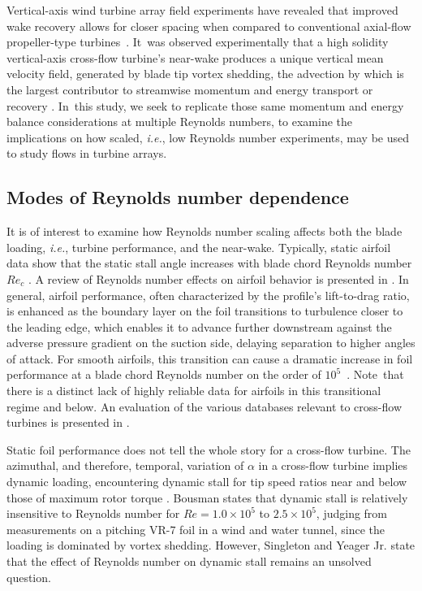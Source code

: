 Vertical-axis wind turbine array field experiments have revealed that improved
wake recovery allows for closer spacing when compared to conventional axial-flow
propeller-type \mbox{turbines \cite{Dabiri2011, Kinzel2012}}. It~was observed
experimentally that a high solidity vertical-axis cross-flow turbine's near-wake
produces a unique vertical mean velocity field, generated by blade tip vortex
shedding, the advection by which is the largest contributor to streamwise
momentum and energy transport or recovery \cite{Bachant2015-JoT}. In~this study,
we seek to replicate those same momentum and energy balance considerations at
multiple Reynolds numbers, to examine the implications on how scaled,
\emph{i.e.}, low Reynolds number experiments, may be used to study flows in
turbine arrays.


\subsection{Modes of Reynolds number dependence}

It is of interest to examine how Reynolds number scaling affects both the blade
loading, \emph{i.e.}, turbine performance, and the near-wake. Typically, static
airfoil data show that the static stall angle increases with blade chord
Reynolds number $Re_c$ \cite{Jacobs1937}. A review of Reynolds number effects on
airfoil behavior is presented in \cite{Lissaman1983}. In general, airfoil
performance, often characterized by the profile's lift-to-drag ratio, is
enhanced as the boundary layer on the foil transitions to turbulence closer to
the leading edge, which enables it to advance further downstream against the
adverse pressure gradient on the suction side, delaying separation to higher
angles of attack. For smooth airfoils, this transition can cause a dramatic
increase in foil performance at a blade chord Reynolds number on the order of
\mbox{$10^5$ \cite{McMasters1980}}. Note~that there is a distinct lack of highly
reliable data for airfoils in this transitional regime and below. An evaluation
of the various databases relevant to cross-flow turbines is presented in
\cite{Bedon2014}.

Static foil performance does not tell the whole story for a cross-flow turbine.
The azimuthal, and therefore, temporal, variation of $\alpha$ in a cross-flow
turbine implies dynamic loading, encountering dynamic stall for tip speed ratios
near and below those of maximum rotor torque \cite{Para2002}. Bousman
\cite{Bousman2000-evaluation} states that dynamic stall is relatively
insensitive to Reynolds number for $Re=1.0 \times 10^5$ to $2.5 \times 10^5$,
judging from measurements on a pitching VR-7 foil in a wind and water tunnel,
since the loading is dominated by vortex shedding. However, Singleton and Yeager
Jr. \cite{Singleton2000} state that the effect of Reynolds number on dynamic
stall remains an unsolved question.

